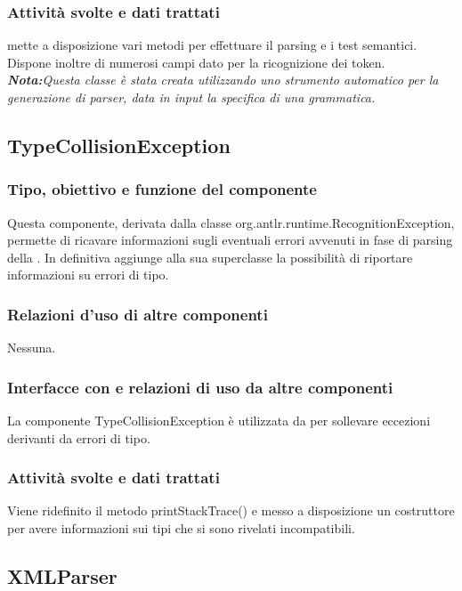 \documentclass[11pt,titlepage,a4paper]{report}
\begin{document}
\subsubsection{Attivit\`a svolte e dati trattati}
\brp mette a disposizione vari metodi per effettuare il parsing e i test semantici. Dispone inoltre di numerosi campi dato per la ricognizione dei token.\\
\textit{\textbf{Nota:}Questa classe \`e stata creata utilizzando uno strumento automatico per la generazione di parser, data in input la specifica di una grammatica.}

\subsection{TypeCollisionException}
\subsubsection{Tipo, obiettivo e funzione del componente}
Questa componente, derivata dalla classe org.antlr.runtime.RecognitionException, permette di ricavare informazioni sugli eventuali errori avvenuti in fase di parsing della \br. In definitiva aggiunge alla sua superclasse la possibilit\`a di riportare informazioni su errori di tipo.
\subsubsection{Relazioni d'uso di altre componenti}
Nessuna.
\subsubsection{Interfacce con e relazioni di uso da altre componenti}
La componente TypeCollisionException \`e utilizzata da \brp per sollevare eccezioni derivanti da errori di tipo.
\subsubsection{Attivit\`a svolte e dati trattati}
Viene ridefinito il metodo printStackTrace() e messo a disposizione un costruttore per avere informazioni sui tipi che si sono rivelati incompatibili.

\subsection{XMLParser}%
\end{document}
